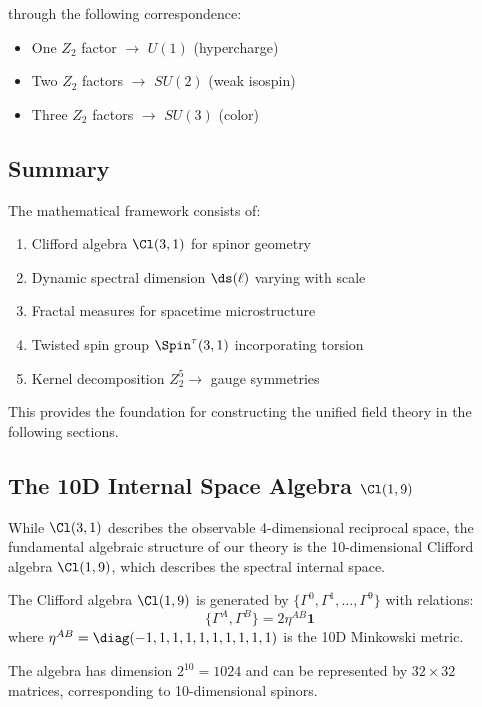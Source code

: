 through the following correspondence:
\begin{itemize}
    \item One $Z_2$ factor $\to$ $U(1)$ (hypercharge)
    \item Two $Z_2$ factors $\to$ $SU(2)$ (weak isospin)
    \item Three $Z_2$ factors $\to$ $SU(3)$ (color)
\end{itemize}

\subsection{Summary}

The mathematical framework consists of:
\begin{enumerate}
    \item Clifford algebra $\Cl(3,1)$ for spinor geometry
    \item Dynamic spectral dimension $\ds(\ell)$ varying with scale
    \item Fractal measures for spacetime microstructure
    \item Twisted spin group $\Spin^\tau(3,1)$ incorporating torsion
    \item Kernel decomposition $Z_2^5 \to$ gauge symmetries
\end{enumerate}

This provides the foundation for constructing the unified field theory in the following sections.

\subsection{The 10D Internal Space Algebra $\Cl(1,9)$}

While $\Cl(3,1)$ describes the observable 4-dimensional reciprocal space, the fundamental algebraic structure of our theory is the 10-dimensional Clifford algebra $\Cl(1,9)$, which describes the spectral internal space.

\begin{definition}
The Clifford algebra $\Cl(1,9)$ is generated by $\{\Gamma^0, \Gamma^1, \ldots, \Gamma^9\}$ with relations:
\begin{equation}
    \{\Gamma^A, \Gamma^B\} = 2\eta^{AB} \mathbf{1}
\end{equation}
where $\eta^{AB} = \diag(-1, 1, 1, 1, 1, 1, 1, 1, 1, 1)$ is the 10D Minkowski metric.
\end{definition}

The algebra has dimension $2^{10} = 1024$ and can be represented by $32 \times 32$ matrices, corresponding to 10-dimensional spinors.

